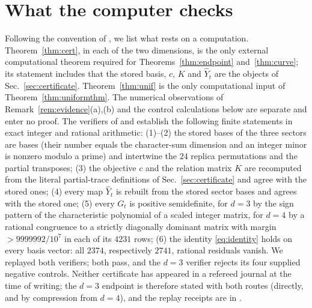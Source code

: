\documentclass[aps,pra,twocolumn,superscriptaddress,nofootinbib,longbibliography]{revtex4-2}
\newcommand{\Yh}{\widehat Y}
\theoremstyle{plain}
\theoremstyle{definition}
\theoremstyle{remark}
\begin{document}
\section{What the computer checks}\label{sec:verification}

Following the convention of \cite{RSST}, we list what rests on a computation. Theorem~\ref{thm:cert}, in each of the two dimensions, is the only external computational theorem required for Theorems~\ref{thm:endpoint} and~\ref{thm:curve}; its statement includes that the stored basis, $c$, $K$ and $\Yh_t$ are the objects of Sec.~\ref{sec:certificate}. Theorem~\ref{thm:unif} is the only computational input of Theorem~\ref{thm:uniformthm}. The numerical observations of Remark~\ref{rem:evidence}(a),(b) and the control calculations below are separate and enter no proof. The verifiers of \cite{Zenodo} and \cite{Liu} establish the following finite statements in exact integer and rational arithmetic: (1)--(2) the stored bases of the three sectors are bases (their number equals the character-sum dimension and an integer minor is nonzero modulo a prime) and intertwine the $24$ replica permutations and the partial transposes; (3) the objective $c$ and the relation matrix $K$ are recomputed from the literal partial-trace definitions of Sec.~\ref{sec:certificate} and agree with the stored ones; (4) every map $\Yh_t$ is rebuilt from the stored sector bases and agrees with the stored one; (5) every $G_t$ is positive semidefinite, for $d=3$ by the sign pattern of the characteristic polynomial of a scaled integer matrix, for $d=4$ by a rational congruence to a strictly diagonally dominant matrix with margin $>9999992/10^7$ in each of its $4231$ rows; (6) the identity \eqref{eq:identity} holds on every basis vector: all $2374$, respectively $2741$, rational residuals vanish. We replayed both verifiers; both pass, and the $d=3$ verifier rejects its four supplied negative controls. Neither certificate has appeared in a refereed journal at the time of writing; the $d=3$ endpoint is therefore stated with both routes (directly, and by compression from $d=4$), and the replay receipts are in \cite{Pkg}.
\end{document}
